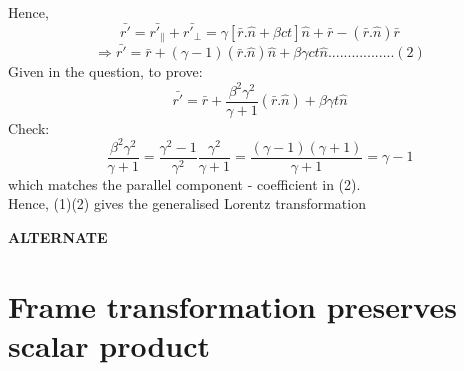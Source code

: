 \documentclass[11pt]{article}
\begin{document}
	Hence,
	\[
		\bar{r'} = \bar{r'_{\parallel}} + \bar{r'_{\perp}} = \gamma[\bar{r}.\hat{n} + \beta ct]\hat{n} + \bar{r} - (\bar{r}.\hat{n})\bar{r} 
	\]
	\[
		\Rightarrow \boxed{\bar{r'}= \bar{r} + (\gamma-1)(\bar{r}.\hat{n})\hat{n} + \beta\gamma ct \hat{n}}.................(2)
	\]
	Given in the question, to prove:
	\[
		\bar{r'} = \bar{r} + \frac{\beta^2\gamma^2}{\gamma+1}(\bar{r}.\hat{n}) + \beta \gamma t \hat{n}
	\]
	Check:
	\[
		\frac{\beta^2 \gamma^2}{\gamma + 1} = \frac{\gamma^2-1}{\gamma^2} \frac{\gamma^2}{\gamma + 1} = \frac{(\gamma-1)(\gamma+1)}{\gamma + 1} = \gamma -1 
	\]
	which matches the parallel component - coefficient in (2).\\
	Hence, (1)(2) gives the generalised Lorentz transformation
	 
	\textbf{\color{red} ALTERNATE}
	
	\section{\color{teal} Frame transformation preserves scalar product}
		
\end{document}
